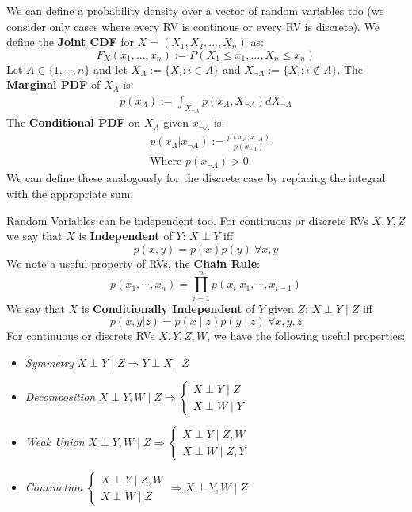 \documentclass[]{article}
\theoremstyle{mattstyle}
\theoremstyle{definition}
\begin{document}
We can define a probability density over a vector of random variables too (we consider only cases where every RV is continous or every RV is discrete). We define the \textbf{Joint CDF} for \( X = (X_1, X_2, ..., X_n)\) as: 
$$F_X(x_1,...,x_n) := P(X_1 \le x_1, ..., X_n \le x_n)$$
Let $A\in\{1,\cdots, n\}$ and let $X_A := \{X_i: i \in A\}$ and $X_{\neg A} := \{X_i: i \not\in A\}$. The \textbf{Marginal PDF} of \(X_A\) is:
	\begin{align*}
	p(x_A) := \int_{X_{\neg A}}p\left(x_A, X_{\neg A}\right)dX_{\neg A}
	\end{align*}
The \textbf{Conditional PDF} on \(X_{A}\) given \(x_{\neg A}\) is:
	\begin{align*}
	&p\left(x_A|x_{\neg A}\right) :=\frac{p\left(x_A, x_{\neg A}\right)}{p(x_{\neg A})}\\
	&\text{Where $p(x_{\neg A}) > 0$}
	\end{align*}
We can define these analogously for the discrete case by replacing the integral with the appropriate sum.

\newpage

Random Variables can be independent too. For continuous or discrete RVs $X,Y, Z$ we say that $X$ is \textbf{Independent} of $Y$: $X \perp Y$ iff
$$ p(x,y) = p(x)p(y) \ \forall x,y$$
We note a useful property of RVs, the \textbf{Chain Rule}:
$$p(x_1, \cdots, x_n) = \prod_{i=1}^{n}p(x_i|x_1, \cdots, x_{i-1})$$
We say that $X$ is \textbf{Conditionally Independent} of $Y$ given $Z$: $X 	\perp Y \mid Z$ iff 
$$p(x,y|z) = p(x \mid z)p(y \mid z) \ \forall x,y,z$$
For continuous or discrete RVs $X,Y,Z,W$, we have the following useful properties:

\begin{itemize}
	\item \emph{Symmetry} $X \perp Y \mid Z \Rightarrow Y \perp X \mid Z$ 
	\item  \emph{Decomposition} $X \perp Y,W \mid Z \Rightarrow 
	\begin{cases}
	X \perp Y \mid Z \\
	X \perp W \mid Y
	\end{cases}$ 
	\item \emph{Weak Union} $X \perp Y,W \mid Z \Rightarrow 	
	\begin{cases}
	X \perp Y \mid Z, W \\
	X \perp W \mid Z, Y
	\end{cases}$ 
	\item \emph{Contraction} $\begin{cases}
	X \perp Y \mid Z,W \\
	X \perp W \mid Z
	\end{cases}
	\Rightarrow X \perp Y, W \mid Z
	$ 
\end{itemize}
\end{document}
